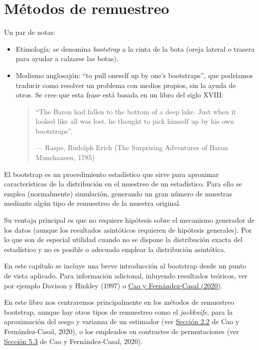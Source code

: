 \documentclass[
  spanish,
  10pt,
]{book}
\theoremstyle{break}
\theoremstyle{nonumberplain}
\begin{document}
\chapter{Métodos de remuestreo}\label{bootstrap}

Un par de notas:

\begin{itemize}
\item
  Etimología: se denomina \emph{bootstrap} a la cinta de la bota (oreja lateral o trasera para ayudar a calzarse las botas).
\item
  Modismo anglosajón: ``to pull oneself up by one's bootstraps'', que podríamos traducir como resolver un problema con medios propios, sin la ayuda de otros.
  Se cree que esta frase está basada en un libro del siglo XVIII:

  \begin{quote}
  ``The Baron had fallen to the bottom of a deep lake.
  Just when it looked like all was lost,
  he thought to pick himself up by his own bootstraps''.

  --- Raspe, Rudolph Erich (The Surprising Adventures of Baron Munchausen, 1785)
  \end{quote}
\end{itemize}

El bootstrap es un procedimiento estadístico que sirve para aproximar características de la distribución en el muestreo de un estadístico.
Para ello se emplea (normalmente) simulación, generando un gran número de muestras mediante algún tipo de remuestreo de la muestra original.

Su ventaja principal es que no requiere hipótesis sobre el mecanismo generador de los datos (aunque los resultados asintóticos requieren de hipótesis generales).
Por lo que son de especial utilidad cuando no se dispone la distribución exacta del estadístico y no es
posible o adecuado emplear la distribución asintótica.

En este capítulo se incluye una breve introducción al bootstrap desde un punto de vista aplicado.
Para información adicional, inluyendo resultados teóricos, ver por ejemplo Davison y Hinkley (1997) o \href{https://rubenfcasal.github.io/book_remuestreo}{Cao y Fernández-Casal (2020)}.

En este libro nos centraremos principalmente en los métodos de remuestreo bootstrap, aunque hay otros tipos de remuestreo como el \emph{jackknife}, para la aproximación del sesgo y varianza de un estimador (ver \href{https://rubenfcasal.github.io/book_remuestreo/jackknife.html}{Sección 2.2} de Cao y Fernández-Casal, 2020), o los empleados en contrastes de permutaciones (ver \href{https://rubenfcasal.github.io/book_remuestreo/contrastes-de-permutaciones.html}{Sección 5.3} de Cao y Fernández-Casal, 2020).
\end{document}
